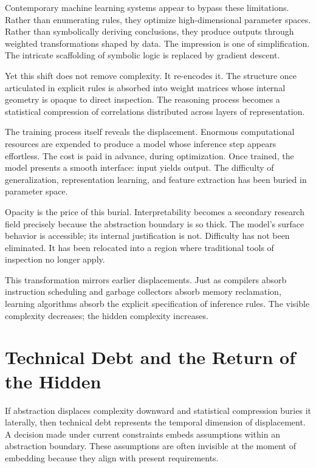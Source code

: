 \documentclass[11pt]{article}
\begin{document}
Contemporary machine learning systems appear to bypass these limitations. Rather than enumerating rules, they optimize high-dimensional parameter spaces. Rather than symbolically deriving conclusions, they produce outputs through weighted transformations shaped by data. The impression is one of simplification. The intricate scaffolding of symbolic logic is replaced by gradient descent.

Yet this shift does not remove complexity. It re-encodes it. The structure once articulated in explicit rules is absorbed into weight matrices whose internal geometry is opaque to direct inspection. The reasoning process becomes a statistical compression of correlations distributed across layers of representation.

The training process itself reveals the displacement. Enormous computational resources are expended to produce a model whose inference step appears effortless. The cost is paid in advance, during optimization. Once trained, the model presents a smooth interface: input yields output. The difficulty of generalization, representation learning, and feature extraction has been buried in parameter space.

Opacity is the price of this burial. Interpretability becomes a secondary research field precisely because the abstraction boundary is so thick. The model's surface behavior is accessible; its internal justification is not. Difficulty has not been eliminated. It has been relocated into a region where traditional tools of inspection no longer apply.

This transformation mirrors earlier displacements. Just as compilers absorb instruction scheduling and garbage collectors absorb memory reclamation, learning algorithms absorb the explicit specification of inference rules. The visible complexity decreases; the hidden complexity increases.

\section{Technical Debt and the Return of the Hidden}

If abstraction displaces complexity downward and statistical compression buries it laterally, then technical debt represents the temporal dimension of displacement. A decision made under current constraints embeds assumptions within an abstraction boundary. These assumptions are often invisible at the moment of embedding because they align with present requirements.
\end{document}

